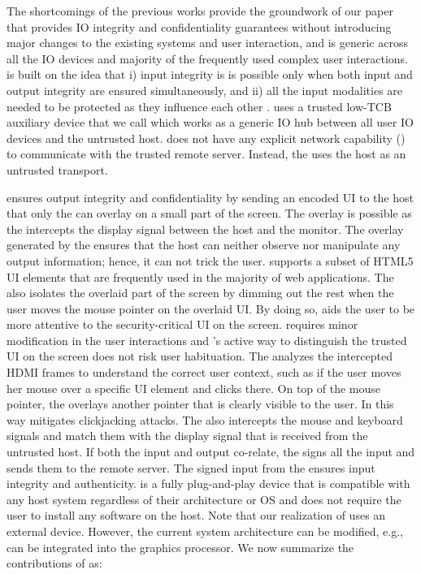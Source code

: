  
 The shortcomings of the previous works provide the groundwork of our paper \name that provides IO integrity and confidentiality guarantees without introducing major changes to the existing systems and user interaction, and is generic across all the IO devices and majority of the frequently used complex user interactions. \name is built on the idea that i) input integrity is is possible only when both input and output integrity are ensured simultaneously, and ii) all the input modalities are needed to be protected as they influence each other . \name uses a trusted low-TCB auxiliary device that we call \device which works as a generic IO hub between all user IO devices and the untrusted host. \device does not have any explicit network capability () to communicate with the trusted remote server. Instead, the \device uses the host as an untrusted transport. 

\name ensures output integrity and confidentiality by sending an encoded UI to the host that only the \device can overlay on a small part of the screen. The overlay is possible as the \device intercepts the display signal between the host and the monitor. The overlay generated by the \device ensures that the host can neither observe nor manipulate any output information; hence, it can not trick the user. \device supports a subset of HTML5 UI elements that are frequently used in the majority of web applications. The \device also isolates the overlaid part of the screen by dimming out the rest when the user moves the mouse pointer on the overlaid UI. By doing so, \name aids the user to be more attentive to the security-critical UI on the screen. \name requires minor modification in the user interactions and \name's active way to distinguish the trusted UI on the screen does not risk user habituation. The \device analyzes the intercepted HDMI frames to understand the correct user context, such as if the user moves her mouse over a specific UI element and clicks there. On top of the mouse pointer, the \device overlays another pointer that is clearly visible to the user. In this way \name mitigates clickjacking attacks. The \device also intercepts the mouse and keyboard signals and match them with the display signal that is received from the untrusted host. If both the input and output co-relate, the \device signs all the input and sends them to the remote server. The signed input from the \device ensures input integrity and authenticity. \device is a fully plug-and-play device that is compatible with any host system regardless of their architecture or OS and does not require the user to install any software on the host. Note that our realization of \name uses an external device. However, the current system architecture can be modified, e.g., \device can be integrated into the graphics processor. We now summarize the contributions of \name as: 

